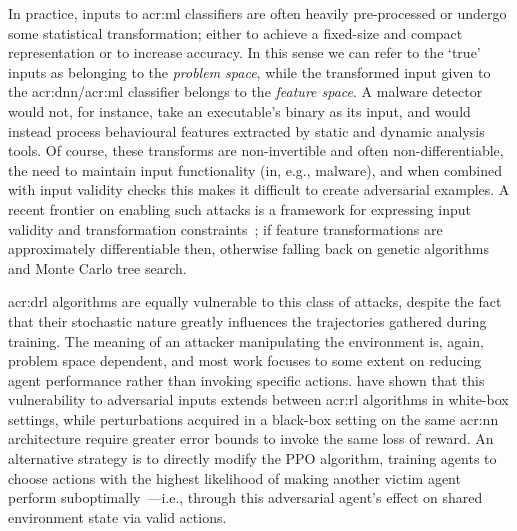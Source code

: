 In practice, inputs to \gls{acr:ml} classifiers are often heavily pre-processed or undergo some statistical transformation; either to achieve a fixed-size and compact representation or to increase accuracy.
In this sense we can refer to the `true' inputs as belonging to the \emph{problem space}, while the transformed input given to the \gls{acr:dnn}/\gls{acr:ml} classifier belongs to the \emph{feature space}.
A malware detector would not, for instance, take an executable's binary as its input, and would instead process behavioural features extracted by static and dynamic analysis tools. 
Of course, these transforms are non-invertible and often non-differentiable, the need to maintain input functionality (in, e.g., malware), and when combined with input validity checks this makes it difficult to create adversarial examples.
A recent frontier on enabling such attacks is a framework for expressing input validity and transformation constraints~\parencite{DBLP:conf/sp/PierazziPCC20}; if feature transformations are approximately differentiable then, otherwise falling back on genetic algorithms and Monte Carlo tree search.

\gls{acr:drl} algorithms are equally vulnerable to this class of attacks, despite the fact that their stochastic nature greatly influences the trajectories gathered during training.
The meaning of an attacker manipulating the environment is, again, problem space dependent, and most work focuses to some extent on reducing agent performance rather than invoking specific actions.
\Textcite{DBLP:journals/corr/HuangPGDA17} have shown that this vulnerability to adversarial inputs extends between \gls{acr:rl} algorithms in white-box settings, while perturbations acquired in a black-box setting on the same \gls{acr:nn} architecture require greater error bounds to invoke the same loss of reward.
An alternative strategy is to directly modify the PPO algorithm, training agents to choose actions with the highest likelihood of making another victim agent perform suboptimally~\parencite{DBLP:conf/uss/Wu0WX21}---i.e., through this adversarial agent's effect on shared environment state via valid actions.


